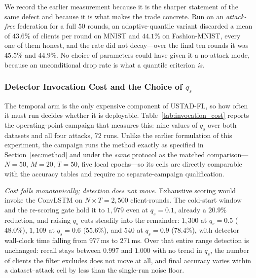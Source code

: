 \documentclass[journal]{IEEEtran}
\begin{document}
We record the earlier measurement because it is the sharper statement of the same defect and because it is what makes the trade concrete. Run on an \emph{attack-free} federation for a full $50$ rounds, an adaptive-quantile variant discarded a mean of $43.6\%$ of clients per round on MNIST and $44.1\%$ on Fashion-MNIST, every one of them honest, and the rate did not decay---over the final ten rounds it was $45.5\%$ and $44.9\%$. No choice of parameters could have given it a no-attack mode, because an unconditional drop rate is what a quantile criterion \emph{is}.

\subsubsection{Detector Invocation Cost and the Choice of $q_s$}
\label{sec:invocation_cost}

The temporal arm is the only expensive component of USTAD-FL, so how often it must run decides whether it is deployable. Table~\ref{tab:invocation_cost} reports the operating-point campaign that measures this: nine values of $q_s$ over both datasets and all four attacks, $72$ runs. Unlike the earlier formulation of this experiment, the campaign runs the method exactly as specified in Section~\ref{sec:method} and under the \emph{same} protocol as the matched comparison---$N=50$, $M=20$, $T=50$, five local epochs---so its cells are directly comparable with the accuracy tables and require no separate-campaign qualification.

\noindent\textit{Cost falls monotonically; detection does not move.} Exhaustive scoring would invoke the ConvLSTM on $N \times T = 2{,}500$ client-rounds. The cold-start window and the re-scoring gate hold it to $1{,}979$ even at $q_s = 0.1$, already a $20.9\%$ reduction, and raising $q_s$ cuts steadily into the remainder: $1{,}300$ at $q_s = 0.5$ ($48.0\%$), $1{,}109$ at $q_s = 0.6$ ($55.6\%$), and $540$ at $q_s = 0.9$ ($78.4\%$), with detector wall-clock time falling from $977$\,ms to $271$\,ms. Over that entire range detection is unchanged: recall stays between $0.997$ and $1.000$ with no trend in $q_s$, the number of clients the filter excludes does not move at all, and final accuracy varies within a dataset--attack cell by less than the single-run noise floor.
\end{document}
